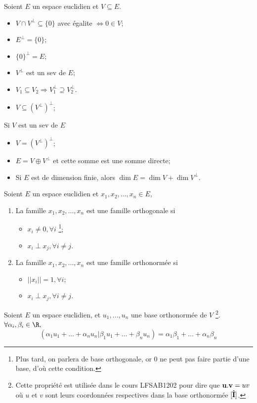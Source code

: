\begin{myprop}
	Soient $E$ un espace euclidien et $V \subseteq E$.
	\begin{itemize}
		\item $V \cap V^{\perp} \subseteq \{0\}$ avec égalite $\iff 0 \in V$;
		\item $E^{\perp} = \{0\}$;
		\item $\{0\}^{\perp} = E$;
		\item $V^{\perp}$ est un sev de $E$;
		\item $V_1 \subseteq V_2 \Rightarrow V_1^{\perp} \supseteq V_2^{\perp}$.
		\item $V \subseteq \left( V^{\perp} \right) ^{\perp}$;
	\end{itemize}
	Si $V$ est un sev de $E$
	\begin{itemize}
		\item $V = \left(V^\perp \right)^\perp$;
		\item $E = V \oplus V^{\perp}$ et cette somme est une somme directe;
			\item
			Si $E$ est de dimension finie, alors
			$\dim E = \dim V + \dim V^{\perp}$.
	\end{itemize}
\end{myprop}


\begin{mydef}
	Soient $E$ un espace euclidien et $x_1, x_2,... ,x_n \in E$,
	\begin{enumerate}
		\item La famille $x_1, x_2,... ,x_n$ est une famille orthogonale si
			\begin{itemize}
				\item $x_i \neq 0, \forall i$ 
				\footnote{Plus tard, on parlera de base orthogonale, or 0 ne peut
				pas faire partie d'une base, d'où cette condition.};
				\item $x_i \perp x_j, \forall i \neq j$.
			\end{itemize}

		\item La famille $x_1, x_2,... ,x_n$ est une famille orthonormée si
			\begin{itemize}
				\item $||x_i|| = 1, \forall i$;
				\item $x_i \perp x_j, \forall i \neq j$.
			\end{itemize}
	\end{enumerate}
\end{mydef}

\begin{myprop}
	Soient $E$ un espace euclidien, et $u_1, \ldots, u_n$ une base orthonormée de $V$
	\footnote{Cette propriété est utilisée dans le cours LFSAB1202 pour dire que ${\bf u}.{\bf v} = uv$
	où $u$ et $v$ sont leurs coordonnées respectives dans la base orthonormée $[{\bf\hat{I}}]$.}.
	$\forall \alpha_i, \beta_i \in \R,$
	$$(\alpha_1u_1 + \ldots + \alpha_nu_n | \beta_1u_1 + \ldots + \beta_nu_n) = \alpha_1\beta_1 + \ldots + \alpha_n\beta_n$$
\end{myprop}


